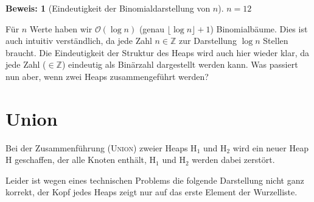 \documentclass[ngerman,draft,parskip=half*,twoside]{scrreprt}
\theoremstyle{break}
\theoremstyle{nonumberbreak}
\newtheorem{beweis}{Beweis:}
\newcommand*{\OO}{\mathcal{O}}      %
\newcommand*{\Z}{\mathbb{Z}}        %
\begin{document}
\begin{beweis}[Eindeutigkeit der Binomialdarstellung von $n$]
$n=12$ 
\end{beweis} 

\begin{figure}[H]
  \centering
   
  
  \end{figure}
  
Für $n$ Werte haben wir $\OO(\log n)$ (genau $\lfloor \log n \rfloor +1$) Binomialbäume. Dies ist auch intuitiv
verständlich, da jede Zahl $n \in \Z$ zur Darstellung $\log n$ Stellen braucht. Die Eindeutigkeit der Struktur
des Heaps wird auch hier wieder klar, da jede Zahl ($\in \Z$) eindeutig als Binärzahl dargestellt werden kann.
Was passiert nun aber, wenn zwei Heaps zusammengeführt werden?

\section{Union}
Bei der Zusammenführung (\textsc{Union}) zweier Heaps H$_1$ und H$_2$ wird ein neuer Heap H geschaffen, der alle Knoten
enthält, H$_1$ und H$_2$ werden dabei zerstört.

%   
%  

Leider ist wegen eines technischen Problems die folgende Darstellung nicht ganz korrekt, der Kopf jedes Heaps zeigt nur
auf das erste Element der Wurzelliste.
\end{document}
